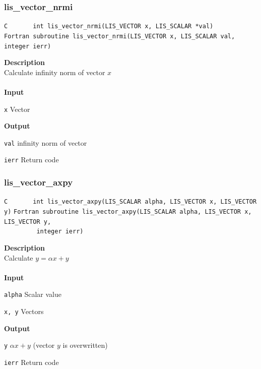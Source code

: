 \documentclass[a4paper]{article}
\newcommand{\namelistlabel}[1]{\mbox{#1}\hfill}
\newenvironment{namelist}[1]{%
 \begin{list}{}
  {\let\makelabel\namelistlabel
  \settowidth{\labelwidth}{#1}
  \setlength{\leftmargin}{1.1\labelwidth}}
}{%
\end{list}}
\begin{document}
  \subsubsection{lis\_vector\_nrmi}
\begin{screen}
\verb|C       int lis_vector_nrmi(LIS_VECTOR x, LIS_SCALAR *val)|\\
\verb|Fortran subroutine lis_vector_nrmi(LIS_VECTOR x, LIS_SCALAR val, integer ierr)|
\end{screen}
{\bf Description}\\
\indent
Calculate infinity norm of vector $x$
\\ \\
\noindent
{\bf Input}
\begin{namelist}{XXXXXXXXXXXXXXXXXXXX}
\item[\tt x] Vector
\end{namelist}
{\bf Output}
\begin{namelist}{XXXXXXXXXXXXXXXXXXXX}
\item[\tt val] infinity norm of vector
\item[\tt ierr] Return code
\end{namelist}
\newpage
  \subsubsection{lis\_vector\_axpy}
\begin{screen}
\verb|C       int lis_vector_axpy(LIS_SCALAR alpha, LIS_VECTOR x, LIS_VECTOR y)|
\verb|Fortran subroutine lis_vector_axpy(LIS_SCALAR alpha, LIS_VECTOR x, LIS_VECTOR y,|\\
\verb|         integer ierr)|
\end{screen}
{\bf Description}\\
\indent
Calculate $y = \alpha x + y$
\\ \\
\noindent
{\bf Input}
\begin{namelist}{XXXXXXXXXXXXXXXXXXXX}
\item[\tt alpha] Scalar value
\item[\tt x, y] Vectors
\end{namelist}
{\bf Output}
\begin{namelist}{XXXXXXXXXXXXXXXXXXXX}
\item[\tt y] $\alpha x + y$ (vector $y$ is overwritten)
\item[\tt ierr] Return code
\end{namelist}
\end{document}
